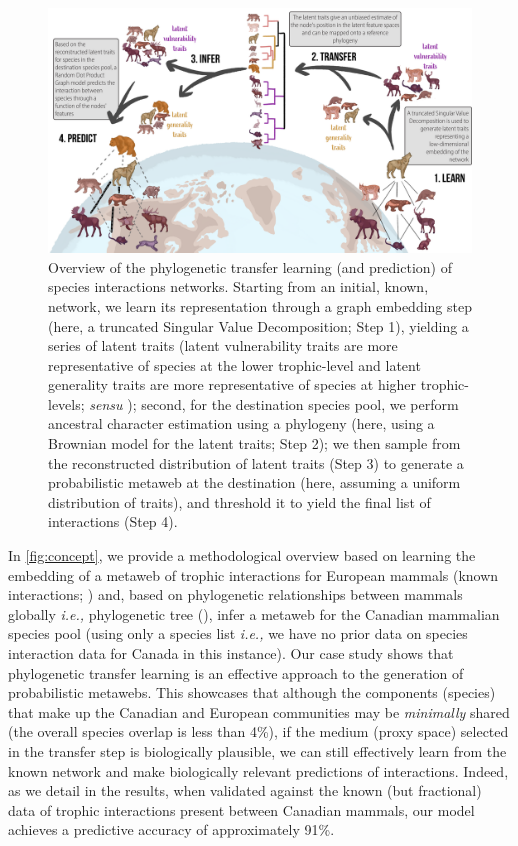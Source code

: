\begin{refsection}
\begin{figure}[h]
    \centering
    \includegraphics[width=\textwidth]{figures/figure-concept_v2.png}
    \caption{Overview of the phylogenetic transfer learning (and prediction)
of species interactions networks. Starting from an initial, known,
network, we learn its representation through a graph embedding step
(here, a truncated Singular Value Decomposition; Step 1), yielding a
series of latent traits (latent vulnerability traits are more
representative of species at the lower trophic-level and latent
generality traits are more representative of species at higher
trophic-levels; \emph{sensu} \cite{Schoener1989Food}); second, for the
destination species pool, we perform ancestral character estimation
using a phylogeny (here, using a Brownian model for the latent traits;
Step 2); we then sample from the reconstructed distribution of latent
traits (Step 3) to generate a probabilistic metaweb at the destination
(here, assuming a uniform distribution of traits), and threshold it to
yield the final list of interactions (Step 4).}
    \label{fig:concept}
\end{figure}

In \autoref{fig:concept}, we provide a methodological overview based on learning
the embedding of a metaweb of trophic interactions for European mammals
(known interactions; \cite{Maiorano2020Tetraeu, Maiorano2020Data}) and,
based on phylogenetic relationships between mammals globally \emph{i.e.,}
phylogenetic tree (\cite{Upham2019Inferring}), infer a metaweb for the Canadian
mammalian species pool (using only a species list \emph{i.e.,} we have no
prior data on species interaction data for Canada in this instance). Our
case study shows that phylogenetic transfer learning is an effective
approach to the generation of probabilistic metawebs. This showcases
that although the components (species) that make up the Canadian and
European communities may be \emph{minimally} shared (the overall species
overlap is less than 4\%), if the medium (proxy space) selected in the
transfer step is biologically plausible, we can still effectively learn
from the known network and make biologically relevant predictions of
interactions. Indeed, as we detail in the results, when validated
against the known (but fractional) data of trophic interactions present
between Canadian mammals, our model achieves a predictive accuracy of
approximately 91\%.


\end{refsection}
